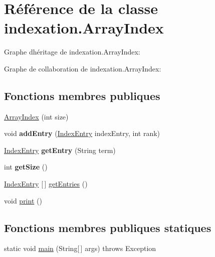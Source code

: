 \hypertarget{classindexation_1_1ArrayIndex}{}\section{Référence de la classe indexation.\+Array\+Index}
\label{classindexation_1_1ArrayIndex}


Graphe d\textquotesingle{}héritage de indexation.\+Array\+Index\+:


Graphe de collaboration de indexation.\+Array\+Index\+:
\subsection*{Fonctions membres publiques}
\begin{DoxyCompactItemize}
\item 
\hyperlink{classindexation_1_1ArrayIndex_a793141160f09fb4d93f2a62151b90b1f}{Array\+Index} (int size)
\item 
\mbox{\label{classindexation_1_1ArrayIndex_a83c79429c120a4955c299cbac7f66d5a}} 
void {\bfseries add\+Entry} (\hyperlink{classindexation_1_1content_1_1IndexEntry}{Index\+Entry} index\+Entry, int rank)
\item 
\mbox{\label{classindexation_1_1ArrayIndex_a2ef8f14f97f27e43963eeda6008091a9}} 
\hyperlink{classindexation_1_1content_1_1IndexEntry}{Index\+Entry} {\bfseries get\+Entry} (String term)
\item 
\mbox{\label{classindexation_1_1ArrayIndex_a616d4476fdbae0a54e9a936c6afcf139}} 
int {\bfseries get\+Size} ()
\item 
\hyperlink{classindexation_1_1content_1_1IndexEntry}{Index\+Entry} \mbox{[}$\,$\mbox{]} \hyperlink{classindexation_1_1ArrayIndex_af83b1f92ab5c523376f11443407374ba}{get\+Entries} ()
\item 
void \hyperlink{classindexation_1_1ArrayIndex_aa5639c426c9b0c833be7826ed01f1222}{print} ()
\end{DoxyCompactItemize}
\subsection*{Fonctions membres publiques statiques}
\begin{DoxyCompactItemize}
\item 
static void \hyperlink{classindexation_1_1ArrayIndex_ae1fcca43891bb344ae97dbf32c065808}{main} (String\mbox{[}$\,$\mbox{]} args)  throws Exception  	
\end{DoxyCompactItemize}


